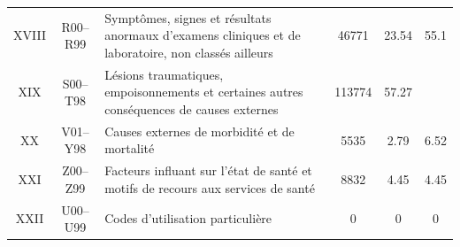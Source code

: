 \documentclass[12pt,english,french,twoside]{report}\usepackage[]{graphicx}\usepackage[]{color}
\begin{document}
\begin{longtable}{|c|c|m{4cm}|c|c|c|}

XVIII&R00–R99&Symptômes, signes et résultats anormaux d'examens cliniques et de laboratoire, non classés ailleurs&46771&23.54&55.1\\

XIX&S00–T98&Lésions traumatiques, empoisonnements et certaines autres conséquences de causes externes&113774&57.27& \\

XX&V01–Y98&Causes externes de morbidité et de mortalité& 5535&2.79&6.52\\

XXI&Z00–Z99&Facteurs influant sur l'état de santé et motifs de recours aux services de santé&8832&4.45&4.45\\

XXII&U00–U99&Codes d'utilisation particulière & 0&0&0\\

  \hline
\end{longtable}
\end{document}
